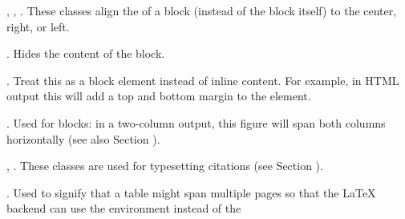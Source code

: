 \documentclass{book}
\begin{document}
\begin{mdUl}[class={list-star,compact},data-line={3423}]
\begin{mdLi}[data-line={3433}]
\begin{mdPre}[class={para-block,pre-indented,language-madoko,lang-madoko,madoko,highlighted},language={madoko},data-line={3437}]
\end{mdPre}%
\end{mdLi}%
\begin{mdLi}[data-line={3438}]%
{}%
{}, %
{}%
{}, %
{}%
{}. These classes align the %
{}%
{}
  of a block (instead of the block itself) to the center, right, or left.%
\end{mdLi}%
\begin{mdLi}[data-line={3440}]%
{}%
{}. Hides the content of the block.%
\end{mdLi}%
\begin{mdLi}[data-line={3441}]%
{}%
{}. Treat this as a block element instead of inline content. For example,
  in HTML output this will add a top and bottom margin to the element.%
\end{mdLi}%
\begin{mdLi}[data-line={3443}]%
{}%
{}. Used for %
{}%
{} blocks: in a two-column output, this figure will span
  both columns horizontally (see also Section%
{}{\mdNbsp}%
{}).%
\end{mdLi}%
\begin{mdLi}[data-line={3445}]%
{}%
{}, %
{}%
{}. These classes are used for typesetting citations (see Section%
{}{\mdNbsp}%
{}).%
\end{mdLi}%
\begin{mdLi}[data-line={3446}]%
{}%
{}. Used to signify that a table might span multiple pages so that
 the LaTeX backend can use the %
{}%
{} environment instead of the 

\end{mdLi}
\end{mdUl}
\end{document}
